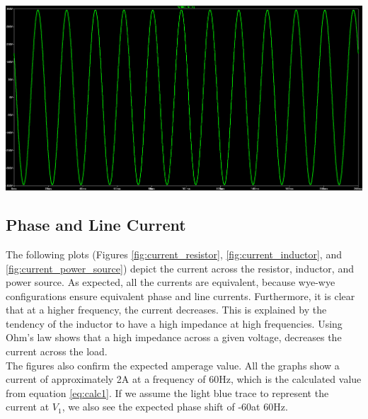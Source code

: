 \documentclass[journal]{IEEEtran}
\begin{document}
\begingroup
    \centering
    \medskip
    \includegraphics[width=\columnwidth]{images/Lab_9_ss_10.PNG}
    \label{fig:line_voltage}
    \medskip
\endgroup



\subsection{Phase and Line Current}

\noindent The following plots (Figures \ref{fig:current_resistor}, \ref{fig:current_inductor}, and \ref{fig:current_power_source}) depict the current across the resistor, inductor, and power source. As expected, all the currents are equivalent, because wye-wye configurations ensure equivalent phase and line currents. Furthermore, it is clear that at a higher frequency, the current decreases. This is explained by the tendency of the inductor to have a high impedance at high frequencies. Using Ohm's law shows that a high impedance across a given voltage, decreases the current across the load. \\

\noindent The figures also confirm the expected amperage value. All the graphs show a current of approximately 2A at a frequency of 60Hz, which is the calculated value from equation \ref{eq:calc1}. If we assume the light blue trace to represent the current at $V_{1}$, we also see the expected phase shift of -60\degree at 60Hz. \\
\end{document}
